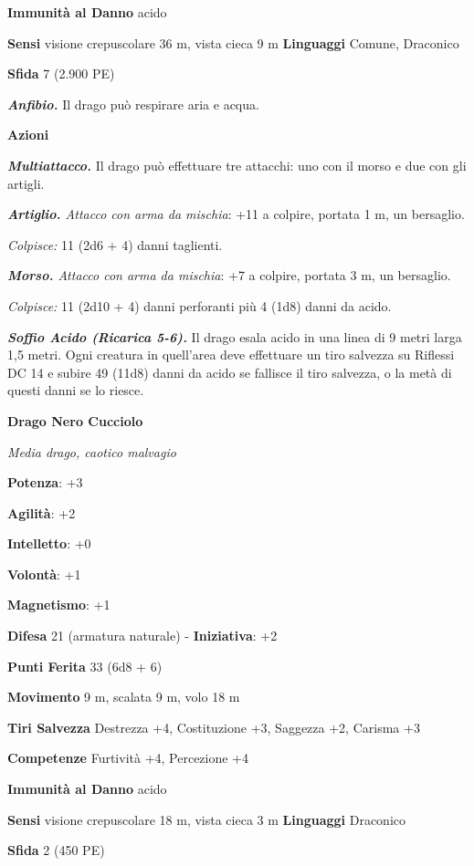 \begin{multicols}{2}
\textbf{Immunità al Danno} acido

\textbf{Sensi} visione crepuscolare 36 m, vista cieca 9 m
\textbf{Linguaggi} Comune, Draconico

\textbf{Sfida} 7 (2.900 PE)\smallskip

\emph{\textbf{Anfibio.}} Il drago può respirare aria e acqua.

\smallskip\textbf{Azioni}

\emph{\textbf{Multiattacco.}} Il drago può effettuare tre attacchi: uno
con il morso e due con gli artigli.

\emph{\textbf{Artiglio.} Attacco con arma da mischia}: +11 a colpire,
portata 1 m, un bersaglio.

\emph{Colpisce:} 11 (2d6 + 4) danni taglienti.

\emph{\textbf{Morso.} Attacco con arma da mischia}: +7 a colpire,
portata 3 m, un bersaglio.

\emph{Colpisce:} 11 (2d10 + 4) danni perforanti più 4 (1d8) danni da
acido.

\emph{\textbf{Soffio Acido (Ricarica 5-6).}} Il drago esala acido in una
linea di 9 metri larga 1,5 metri. Ogni creatura in quell'area deve
effettuare un tiro salvezza su Riflessi DC 14 e subire 49 (11d8) danni
da acido se fallisce il tiro salvezza, o la metà di questi danni se lo
riesce.

\textbf{Drago Nero Cucciolo}

\emph{Media drago, caotico malvagio}

\textbf{Potenza}: +3

\textbf{Agilità}: +2

\textbf{Intelletto}: +0

\textbf{Volontà}: +1

\textbf{Magnetismo}: +1

\textbf{Difesa} 21 (armatura naturale) - \textbf{Iniziativa}: +2

\textbf{Punti Ferita} 33 (6d8 + 6)

\textbf{Movimento} 9 m, scalata 9 m, volo 18 m

\textbf{Tiri Salvezza} Destrezza +4, Costituzione +3, Saggezza +2,
Carisma +3

\textbf{Competenze} Furtività +4, Percezione +4

\textbf{Immunità al Danno} acido

\textbf{Sensi} visione crepuscolare 18 m, vista cieca 3 m
\textbf{Linguaggi} Draconico

\textbf{Sfida} 2 (450 PE)\smallskip


\end{multicols}
